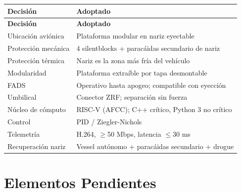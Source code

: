 \documentclass[11pt, a4paper]{article}
\begin{document}
\begin{longtable}{L{5.5cm} L{8cm}}
  \color{white}\textbf{Decisi\'{o}n}&\color{white}\textbf{Adoptado}\\
  \endfirsthead
  \color{white}\textbf{Decisi\'{o}n}&\color{white}\textbf{Adoptado}\\
  \endhead
  Ubicaci\'{o}n avi\'{o}nica      & Plataforma modular en nariz eyectable \\
  Protecci\'{o}n mec\'{a}nica     & 4 silentblocks + parac\'{a}idas secundario de nariz \\
  Protecci\'{o}n t\'{e}rmica      & Nariz es la zona m\'{a}s fr\'{i}a del veh\'{i}culo \\
  Modularidad                      & Plataforma extra\'{i}ble por tapa desmontable \\
  FADS                             & Operativo hasta apogeo; compatible con eyecci\'{o}n \\
  Umbilical                        & Conector ZRF; separaci\'{o}n sin fuerza \\
  N\'{u}cleo de c\'{o}mputo       & RISC-V (AFCC); C++ cr\'{i}tico, Python 3 no cr\'{i}tico \\
  Control                          & PID / Ziegler-Nichols \\
  Telemetr\'{i}a                   & H.264, $\geq$50 Mbps, latencia $\leq$30 ms \\
  Recuperaci\'{o}n nariz           & Vessel aut\'{o}nomo + parac\'{a}idas secundario + drogue \\
\end{longtable}

\section{Elementos Pendientes}
\end{document}
